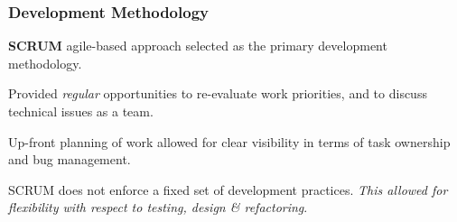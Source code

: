 \documentclass[10pt, compress]{beamer}
\begin{document}
\begin{frame}[fragile]
  \frametitle{Development Methodology}
  
   \small{ 
   
   \textbf{SCRUM} agile-based approach selected as the primary development methodology.
   
   \vspace{20pt}
   
   
	
  		
  	Provided \textit{regular} opportunities to re-evaluate work priorities, and to discuss technical issues as a team.
  		
  	Up-front planning of work allowed for clear visibility in terms of task ownership and bug management.
  	
  	SCRUM does not enforce a fixed set of development practices. \textit{This allowed for flexibility with respect to testing, design \& refactoring}.  
  	
  	
	  
   }
   
\end{frame}
\end{document}
